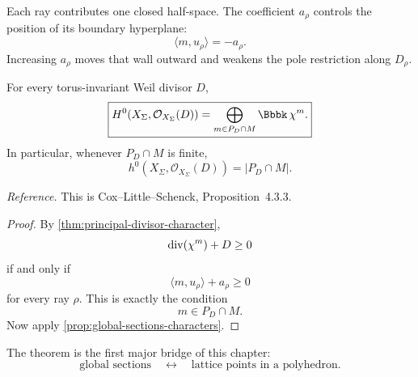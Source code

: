 Each ray contributes one closed half-space. The coefficient \(a_\rho\)
controls the position of its boundary hyperplane:
\[
\langle m,u_\rho\rangle=-a_\rho.
\]
Increasing \(a_\rho\) moves that wall outward and weakens the pole
restriction along \(D_\rho\).

\begin{theorem}
\label{thm:lattice-points-global-sections}
For every torus-invariant Weil divisor \(D\),
\[
\boxed{
H^0(X_\Sigma,\mathcal O_{X_\Sigma}(D))
=
\bigoplus_{m\in P_D\cap M}
\Bbbk\,\character{m}.
}
\]
In particular, whenever \(P_D\cap M\) is finite,
\[
h^0(X_\Sigma,\mathcal O_{X_\Sigma}(D))
=
|P_D\cap M|.
\]
\end{theorem}

\noindent
\textit{Reference.}
This is Cox--Little--Schenck, Proposition~4.3.3.

\begin{proof}
By \cref{thm:principal-divisor-character},
\[
\operatorname{div}(\chi^{m})+D\geq0
\]
if and only if
\[
\langle m,u_\rho\rangle+a_\rho\geq0
\]
for every ray \(\rho\). This is exactly the condition
\[
m\in P_D\cap M.
\]
Now apply \cref{prop:global-sections-characters}.
\end{proof}

The theorem is the first major bridge of this chapter:
\[
\boxed{
\text{global sections}
\quad\longleftrightarrow\quad
\text{lattice points in a polyhedron}.
}
\]

